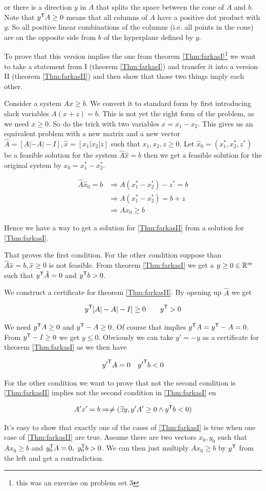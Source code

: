 or there is a direction $y$ in $A$ that splits the space between the cone of $A$ and $b$. Note that ${y}^\text{\upshape \sffamily T} A\geq 0$ means that all columns of $A$ have a positive dot product with $y$. So all positive linear combinations of the columns (i.e. all points in the cone) are on the opposite side from $b$ of the hyperplane defined by $y$.

To prove that this version implies the one from theorem \ref{Thm:farkasI}\footnote{this was an exercise on problem set 3} we want to take a statement from I (theorem \ref{Thm:farkasI}) and transfer it into a version II (theorem \ref{Thm:farkasII}) and then show that those two things imply each other.

Consider a system $Ax\geq b$. We convert it to standard form by first introducing slack variables $A(x+z) =b$. This is not yet the right form of the problem, as we need $x\geq 0$. So do the trick with two variables $x=x_1-x_2$. This gives us an equivalent problem with a new matrix and a new vector $\hat A= [A|-A|-I], \hat x=[x_1|x_2|z]$ such that $x_1,x_2,z\geq 0$.  Let $\hat x_0=(x_1^*,x_2^*,z^*)$ be a feasible solution for the system $\hat A \hat x = b$ then we get a feasible solution for the original system by $x_0=x_1^*-x_2^*$. 

\begin{align*}
\hat A \hat x_0 =b &\Rightarrow A(x_1^*-x_2^*)-z^*=b\\
	&\Rightarrow A(x_1^*-x_2^*) = b+z\\
	&\Rightarrow Ax_0 \geq b
\end{align*}

Hence we have a way to get a solution for \ref{Thm:farkasII} from a solution for \ref{Thm:farkasI}.

That proves the first condition. For the other condition suppose than $\hat A \hat x=b, \hat x\geq 0$ is not feasible. From theorem \ref{Thm:farkasI} we get a $y\geq 0\in \mathbb{R}^m$ such that ${y}^\text{\upshape \sffamily T} \hat A = 0$ and ${y}^\text{\upshape \sffamily T} b>0$.

We construct a certificate for theorem \ref{Thm:farkasII}. By opening up $\hat A$ we get

\[{y}^\text{\upshape \sffamily T}[A|-A|-I] \geq 0 \qquad {y}^\text{\upshape \sffamily T} >0\]

We need ${y}^\text{\upshape \sffamily T} A \geq 0$ and ${y}^\text{\upshape \sffamily T} -A\geq 0$. Of course that implies ${y}^\text{\upshape \sffamily T} A = {y}^\text{\upshape \sffamily T} -A =0$. From ${y}^\text{\upshape \sffamily T} -I \geq 0$ we get $y\leq 0$. Obviously we can take $y'=-y$ as a certificate for theorem \ref{Thm:farkasI} as we then have 

\[{y'}^\text{\upshape \sffamily T}A =0\quad {y'}^\text{\upshape \sffamily T} b<0\]

For the other condition we want to prove that not the second condition is \ref{Thm:farkasII} implies not the second condition in \ref{Thm:farkasI} en 

\[A'x' = b \Rightarrow \neq (\exists y, y'A'\geq 0 \wedge {y}^\text{\upshape \sffamily T}b <0)\]

It's easy to show that exactly one of the cases of \ref{Thm:farkasI} is true when one case of \ref{Thm:farkasII} are true. Assume there are two vectors $x_0,y_0$ such that $Ax_0\geq b$ and ${y}^\text{\upshape \sffamily T}_0A=0,\ {y}^\text{\upshape \sffamily T}_0b>0$. We can then just multiply $Ax_0\geq b$ by ${y}^\text{\upshape \sffamily T}$ from the left and get a contradiction.